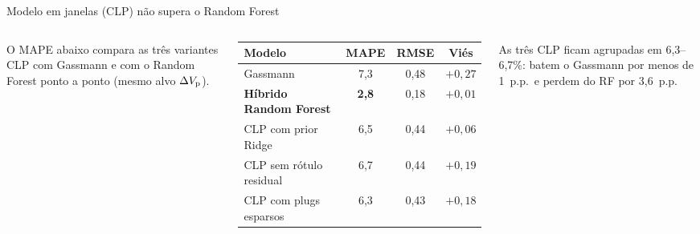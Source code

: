 \documentclass[aspectratio=169,10pt]{beamer}
\begin{document}
\begin{frame}{Modelo em janelas (CLP) não supera o Random Forest}
  \begin{columns}[T,onlytextwidth]
    \footnotesize
    O MAPE abaixo compara as três variantes CLP com Gassmann e com o
    Random Forest ponto a ponto (mesmo alvo $\Delta V_{\mathrm{p}}$).
    \par
    \vspace{0.06cm}
    {\centering
    \scriptsize
    \setlength{\tabcolsep}{4pt}
    \begin{tabular}{lccc}
      \toprule
      Modelo & MAPE & RMSE & Viés \\
      \midrule
      Gassmann & 7,3 & 0,48 & $+0{,}27$ \\
      \textbf{Híbrido Random Forest} & \textbf{2,8} & 0,18 & $+0{,}01$ \\
      CLP com prior Ridge & 6,5 & 0,44 & $+0{,}06$ \\
      CLP sem rótulo residual & 6,7 & 0,44 & $+0{,}19$ \\
      CLP com plugs esparsos & 6,3 & 0,43 & $+0{,}18$ \\
      \bottomrule
    \end{tabular}
    \par}
    \vspace{0.08cm}
    {\scriptsize As três CLP ficam agrupadas em 6,3--6,7\%: batem o Gassmann
    por menos de 1~p.p.\ e perdem do RF por 3,6~p.p.}
  \end{columns}
\end{frame}
\end{document}
